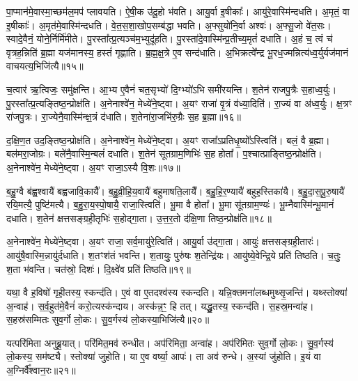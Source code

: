पा॒प्मान॑मे॒वास्मा॒च्छम॑ल॒मप॑ प्लावयति।
ऐ॒षी॒क उ॑दू॒हो भ॑वति।
आयु॒र्वा इ॒षीकाः᳚।
आयु॑रे॒वास्मि॑न्दधति।
अ॒मृतं॒ वा इ॒षीकाः᳚।
अ॒मृत॑मे॒वास्मि॑न्दधति।
वे॒त॒स॒शा॒खोप॒सम्ब॑द्धा भवति।
अ॒फ्सुयो॑नि॒र्वा अश्वः॑।
अ॒फ्सु॒जो वे॑त॒सः।
स्वादे॒वैनं॒ योने॒र्निर्मि॑मीते।
पु॒रस्ता᳚त्प्र॒त्यञ्च॑म॒भ्युदू॑हति।
पु॒रस्ता॑दे॒वास्मि॑न्प्र॒तीच्य॒मृतं॑ दधाति।
अ॒हं च॒ त्वं च॑ वृत्रह॒न्निति॑ ब्र॒ह्मा यज॑मानस्य॒ हस्तं॑ गृह्णाति।
ब्र॒ह्म॒क्ष॒त्रे ए॒व सन्द॑धाति।
अ॒भिक्रत्वे᳚न्द्र भू॒रध॒ज्मन्नित्य॑ध्व॒र्युर्यज॑मानं वाचयत्य॒भिजि॑त्यै॥१५॥\ip\anuvakamend[भ॒व॒ति॒ प्ला॒व॒य॒ति॒ मि॒मी॒ते॒ पञ्च॑ च]

च॒त्वार॑ ऋ॒त्विजः॒ समु॑क्षन्ति।
आ॒भ्य ए॒वैनं॑ चत॒सृभ्यो॑ दि॒ग्भ्यो॑\-ऽभि समी॑रयन्ति।
श॒तेन॑ राजपु॒त्रैः स॒हाध्व॒र्युः।
पु॒रस्ता᳚त्\-प्र॒त्यङ्तिष्ठ॒न्प्रोक्ष॑ति।
अ॒नेनाश्वे॑न॒ मेध्ये॑ने॒ष्ट्वा।
अ॒यꣳ राजा॑ वृ॒त्रं व॑ध्या॒दिति॑।
रा॒ज्यं वा अ॑ध्व॒र्युः।
क्ष॒त्रꣳ रा॑जपु॒त्रः।
रा॒ज्ये\-नै॒वास्मि॑न्क्ष॒त्रं द॑धाति।
श॒तेना॑रा॒जभि॑रु॒ग्रैः स॒ह ब्र॒ह्मा॥१६॥\ip

द॒क्षि॒ण॒त उद॒ङ्तिष्ठ॒न्प्रोक्ष॑ति।
अ॒नेनाश्वे॑न॒ मेध्ये॑ने॒ष्ट्वा।
अ॒यꣳ राजा᳚\-ऽप्रतिधृ॒ष्यो᳚\-ऽस्त्विति॑।
बलं॒ वै ब्र॒ह्मा।
बल॑मरा॒जोग्रः।
बले॑\-नै॒वा\-स्मि॒न्बलं॑ दधाति।
श॒तेन॑ सूतग्राम॒णिभिः॑ स॒ह होता᳚।
प॒श्चात्प्राङ्तिष्ठ॒न्प्रोक्ष॑ति।
अ॒नेनाश्वे॑न॒ मेध्ये॑ने॒ष्ट्वा।
अ॒यꣳ राजा॒\-ऽस्यै वि॒शः॥१७॥\ip

ब॒हु॒ग्वै ब॑ह्व॒श्वायै॑ बह्वजावि॒कायै᳚।
ब॒हु॒व्री॒हि॒य॒वायै॑ बहुमाष\-ति॒लायै᳚।
ब॒हु॒हि॒र॒ण्यायै॑ बहुह॒स्तिका॑यै।
ब॒हु॒दा॒स॒\-पू॒रु॒षायै॑ रयि॒मत्यै॒ पुष्टि॑मत्यै।
ब॒हु॒रा॒य॒स्पो॒षायै॒ राजा॒स्त्विति॑।
भू॒मा वै होता᳚।
भू॒मा सू॑तग्राम॒ण्यः॑।
भू॒म्नैवास्मि॑न्भू॒मानं॑ दधाति।
श॒तेन॑ क्षत्तसङ्ग्रही॒तृभिः॑ स॒होद्गा॒ता।
उ॒त्त॒र॒तो द॑क्षि॒णा तिष्ठ॒न्प्रोक्ष॑ति॥१८॥\ip

अ॒नेनाश्वे॑न॒ मेध्ये॑ने॒ष्ट्वा।
अ॒यꣳ राजा॒ सर्व॒मायु॑रे॒त्विति॑।
आयु॒र्वा उ॑द्गा॒ता।
आयुः॑ क्षत्तसङ्ग्रही॒तारः॑।
आयु॑षै॒वास्मि॒न्नायु॑र्द\-धाति।
श॒तꣳ\-श॑तं भवन्ति।
श॒तायुः॒ पुरु॑षः श॒तेन्द्रि॑यः।
आयु॑ष्ये॒वेन्द्रि॒ये प्रति॑ तिष्ठति।
च॒तुः॒ श॒ता भ॑वन्ति।
चत॑स्रो॒ दिशः॑।
दि॒क्ष्वे॑व प्रति॑ तिष्ठति॥१९॥\ip\anuvakamend[ब्र॒ह्मा वि॒श उ॑क्षति॒ दिश॒ एकं॑ च]

यथा॒ वै ह॒विषो॑ गृही॒तस्य॒ स्कन्द॑ति।
ए॒वं वा ए॒तदश्व॑स्य स्कन्दति।
यन्नि॒क्तमना॑लब्धमुथ्सृ॒जन्ति॑।
यथ्स्तोक्या॑ अ॒न्वाह॑।
स॒र्व॒हुत॑मे॒वैनं॑ करो॒त्यस्क॑न्दाय।
अस्क॑न्न॒ꣳ॒ हि तत्।
यद्धु॒तस्य॒ स्कन्द॑ति।
स॒हस्र॒मन्वा॑ह।
स॒हस्र॑सम्मितः सुव॒र्गो लो॒कः।
सु॒व॒र्गस्य॑ लो॒कस्या॒भिजि॑त्यै॥२०॥\ip

यत्परि॑मिता अनुब्रू॒यात्।
परि॑मित॒मव॑ रुन्धीत।
अप॑रिमिता॒ अन्वा॑ह।
अप॑रिमितः सुव॒र्गो लो॒कः।
सु॒व॒र्गस्य॑ लो॒कस्य॒ सम॑ष्ट्यै।
स्तोक्या॑ जुहोति।
या ए॒व वर्ष्या॒ आपः॑।
ता अव॑ रुन्धे।
अ॒स्यां जु॑होति।
इ॒यं वा अ॒ग्निर्वै᳚श्वान॒रः॥२१॥\ip

